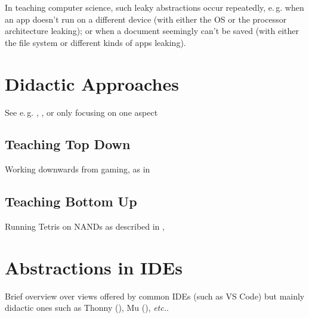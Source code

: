 In teaching computer science, such leaky abstractions occur repeatedly, e.\,g. when an app doesn't run on a different device (with either the OS or the processor architecture leaking); or when a document seemingly can't be saved (with either the file system or different kinds of apps leaking).



\section{Didactic Approaches} \label{sc_didactic}
See e.\,g. \cite{Sch11}, \cite{Mod16}, \cite{Har20} or \cite{Lee20} only focusing on one aspect

\subsection{Teaching Top Down}
Working downwards from gaming, as in \cite{Wei16}

\subsection{Teaching Bottom Up}
Running Tetris on NANDs as described in \cite{Cak17}, \cite{Nis21}


\section{Abstractions in IDEs} \label{sc_ides}
Brief overview over views offered by common IDEs (such as VS Code) but mainly didactic ones such as Thonny (\cite{Ann15}), Mu (\cite{Tol23}), \emph{etc.}.
